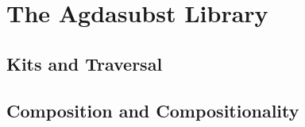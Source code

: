 \documentclass[screen,nonacm]{acmart}
\begin{document}
\section{The Agdasubst Library}\label{sec:ags}



\subsection{Kits and Traversal}\label{sec:ags-kit}


\subsection{Composition and Compositionality}\label{sec:ags-kit}

\end{document}
